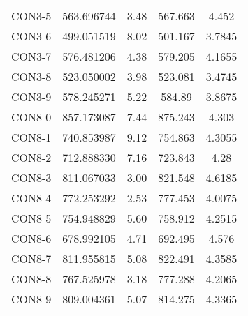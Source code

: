 \begin{table}[ht]
\begin{tabular}{c c c c c}
CON3-5 & 563.696744 & 3.48 & 567.663 & 4.452 \\
CON3-6 & 499.051519 & 8.02 & 501.167 & 3.7845 \\
CON3-7 & 576.481206 & 4.38 & 579.205 & 4.1655 \\
CON3-8 & 523.050002 & 3.98 & 523.081 & 3.4745 \\
CON3-9 & 578.245271 & 5.22 & 584.89 & 3.8675 \\
CON8-0 & 857.173087 & 7.44 & 875.243 & 4.303 \\
CON8-1 & 740.853987 & 9.12 & 754.863 & 4.3055 \\
CON8-2 & 712.888330 & 7.16 & 723.843 & 4.28 \\
CON8-3 & 811.067033 & 3.00 & 821.548 & 4.6185 \\
CON8-4 & 772.253292 & 2.53 & 777.453 & 4.0075 \\
CON8-5 & 754.948829 & 5.60 & 758.912 & 4.2515 \\
CON8-6 & 678.992105 & 4.71 & 692.495 & 4.576 \\
CON8-7 & 811.955815 & 5.08 & 822.491 & 4.3585 \\
CON8-8 & 767.525978 & 3.18 & 777.288 & 4.2065 \\
CON8-9 & 809.004361 & 5.07 & 814.275 & 4.3365 \\
[1ex]\hline
\end{tabular}
\label{table:nonlin}
\end{table} \clearpage
